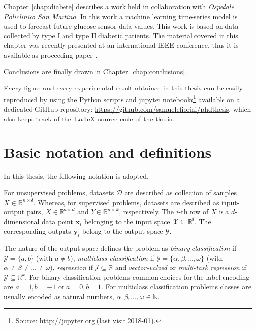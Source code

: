Chapter~\ref{chap:diabete} describes a work held in collaboration with \textit{Ospedale Policlinico San Martino}. In this work a machine learning time-series model is used to forecast future glucose sensor data values. This work is based on data collected by type I and type II diabetic patients.
The material covered in this chapter was recently presented at an international IEEE conference, thus it is available as proceeding paper~\cite{fiorini2017data}.

Conclusions are finally drawn in Chapter~\ref{chap:conclusions}.

Every figure and every experimental result obtained in this thesis can be easily reproduced by using the Python scripts and {\sc jupyter}  notebooks\footnote{ Source: \url{http://jupyter.org} (last visit 2018-01).} available on a dedicated GitHub repository: \url{https://github.com/samuelefiorini/phdthesis}, which also keeps track of the~\LaTeX~source code of the thesis.

\section{Basic notation and definitions} \label{sec:notation}
In this thesis, the following notation is adopted.

For unsupervised problems, datasets $\mathcal{D}$ are described as collection of samples $X \in \mathbb{R}^{n \times d}$. Whereas, for supervised problems, datasets are described as input-output pairs, $X \in \mathbb{R}^{n \times d}$ and $Y \in \mathbb{R}^{n \times k}$, respectively.
The $i$-th row of $X$ is a $d$-dimensional data point $\bm{x}_{i}$ belonging to the input space $\mathcal{X}\subseteq\mathds{R}^d$. The corresponding outputs $\bm{y}_{i}$ belong to the output space $\mathcal{Y}$.

The nature of the output space defines the problem as \textit{binary classification} if  $\mathcal{Y} = \{a,b\}$ (with $a\neq b$), \textit{multiclass classification} if
$\mathcal{Y} = \{\alpha,\beta,\dots,\omega\}$
(with $\alpha \neq \beta \neq \dots \neq \omega$),
\textit{regression} if $\mathcal{Y}\subseteq\mathds{R}$ and
\textit{vector-valued} or \textit{multi-task regression} if $\mathcal{Y}\subseteq\mathds{R}^k$.
For binary classification problems common choices for the label encoding are $a=1, b=-1$ or $a=0, b=1$.
For multiclass classification problems classes are usually encoded as natural numbers, \ie $\alpha, \beta, \dots, \omega \in \mathbb{N}$.

